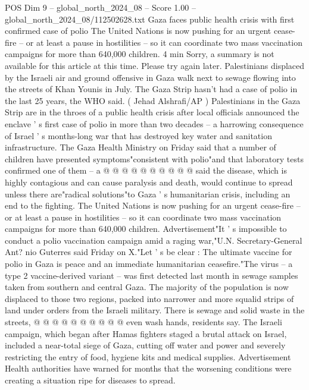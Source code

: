 \begin{textsample}{POS Dim 9 – global\_north\_2024\_08 – Score 1.00 – global\_north\_2024\_08/112502628.txt}  \label{ex:f9_pos_192}
Gaza faces public health crisis with first confirmed case of polio The United Nations is now pushing for an urgent cease-fire -- or at least a pause in hostilities -- so it can coordinate two mass vaccination campaigns for more than 640,000 children. 4 min Sorry, a summary is not available for this article at this time.
Please try again later.
Palestinians displaced by the Israeli air and ground offensive in Gaza walk next to sewage flowing into the streets of Khan Younis in July.
The Gaza Strip hasn't had a case of polio in the last 25 years, the WHO said. ( Jehad Alshrafi/AP ) Palestinians in the Gaza Strip are in the throes of a public health crisis after local officials announced the enclave ' s first case of polio in more than two decades -- a harrowing consequence of Israel ' s months-long war that has destroyed key water and sanitation infrastructure.
The Gaza Health Ministry on Friday said that a number of children have presented symptoms"consistent with polio"and that laboratory tests confirmed one of them -- a @ @ @ @ @ @ @ @ @ @ said the disease, which is highly contagious and can cause paralysis and death, would continue to spread unless there are"radical solutions"to Gaza ' s humanitarian crisis, including an end to the fighting.
The United Nations is now pushing for an urgent cease-fire -- or at least a pause in hostilities -- so it can coordinate two mass vaccination campaigns for more than 640,000 children.
Advertisement"It ' s impossible to conduct a polio vaccination campaign amid a raging war,"U.N.
Secretary-General Ant? nio Guterres said Friday on X."Let ' s be clear : The ultimate vaccine for polio in Gaza is peace and an immediate humanitarian ceasefire."The virus -- a type 2 vaccine-derived variant -- was first detected last month in sewage samples taken from southern and central Gaza.
The majority of the population is now displaced to those two regions, packed into narrower and more squalid strips of land under orders from the Israeli military.
There is sewage and solid waste in the streets, @ @ @ @ @ @ @ @ @ @ even wash hands, residents say.
The Israeli campaign, which began after Hamas fighters staged a brutal attack on Israel, included a near-total siege of Gaza, cutting off water and power and severely restricting the entry of food, hygiene kits and medical supplies.
Advertisement Health authorities have warned for months that the worsening conditions were creating a situation ripe for diseases to spread.

\end{textsample}

